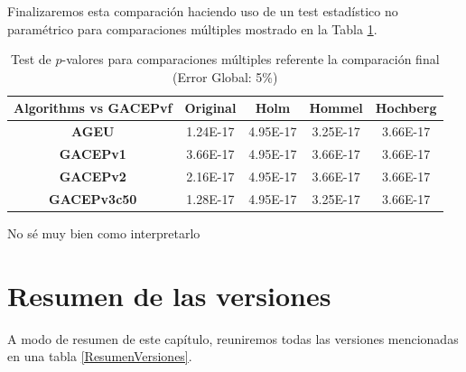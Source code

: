 Finalizaremos esta comparación haciendo uso de un test estadístico no paramétrico para comparaciones múltiples mostrado en la Tabla \ref{TestFinal}.

\begin{table}[h]
\begin{tabular}{|c|c|c|c|c|}
\hline
\multicolumn{1}{|l|}{Algorithms vs  GACEPvf} & \textbf{Original} & \textbf{Holm}                   & \textbf{Hommel}                 & \textbf{Hochberg}               \\ \hline
\textbf{AGEU}                                & 1.24E-17          & {\color[HTML]{0000FF} 4.95E-17} & {\color[HTML]{0000FF} 3.25E-17} & {\color[HTML]{0000FF} 3.66E-17} \\ \hline
\textbf{GACEPv1}                             & 3.66E-17          & {\color[HTML]{0000FF} 4.95E-17} & {\color[HTML]{0000FF} 3.66E-17} & {\color[HTML]{0000FF} 3.66E-17} \\ \hline
\textbf{GACEPv2}                             & 2.16E-17          & {\color[HTML]{0000FF} 4.95E-17} & {\color[HTML]{0000FF} 3.66E-17} & {\color[HTML]{0000FF} 3.66E-17} \\ \hline
\textbf{GACEPv3c50}                          & 1.28E-17          & {\color[HTML]{0000FF} 4.95E-17} & {\color[HTML]{0000FF} 3.25E-17} & {\color[HTML]{0000FF} 3.66E-17} \\ \hline
\end{tabular}
\caption{\label{TestFinal}Test de $p$-valores para comparaciones múltiples referente la comparación final (Error Global: 5\%)}
\end{table}

\color{red}
No sé muy bien como interpretarlo
\color{black}

\section{Resumen de las versiones}

A modo de resumen de este capítulo, reuniremos todas las versiones mencionadas en una tabla \ref{ResumenVersiones}.

